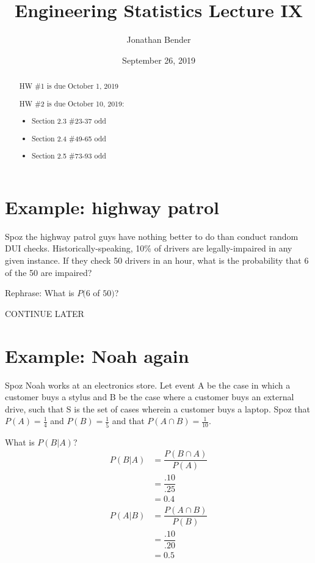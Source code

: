 \documentclass[]{article}
\title{Engineering Statistics Lecture IX}
\author{Jonathan Bender}
\date{September 26, 2019}
\begin{document}
	
	\maketitle
	
	\begin{abstract}
		HW \#1 is due October 1, 2019
		
		HW \#2 is due October 10, 2019:
		\begin{itemize}
			\item Section 2.3 \#23-37 odd
			\item Section 2.4 \#49-65 odd
			\item Section 2.5 \#73-93 odd
		\end{itemize}
	\end{abstract}
	
	\section{Example: highway patrol}
	
	
	Spoz the highway patrol guys have nothing better to do than conduct random DUI checks.
	Historically-speaking, 10\% of drivers are legally-impaired in any given instance.
	If they check 50 drivers in an hour, what is the probability that 6 of the 50 are impaired?
	
	Rephrase: What is $P(6$ of $50)$?
	
	CONTINUE LATER
	
	\section{Example: Noah again}
	
	Spoz Noah works at an electronics store. Let event A be the case in which a customer buys a stylus and B be the case where a customer buys an external drive, such that S is the set of cases wherein a customer buys a laptop.
	Spoz that $P(A) = \frac{1}{4}$ and $P(B) = \frac{1}{5}$ and that $P(A\cap B) = \frac{1}{10}$.
	
	What is $P(B|A)$?
	\begin{align*}
	P(B|A) &= \dfrac{P(B\cap A)}{P(A)}
	     \\&= \dfrac{.10}{.25}
	     \\&= 0.4\\
	P(A|B) &= \dfrac{P(A\cap B)}{P(B)}
	     \\&= \dfrac{.10}{.20}
	     \\&= 0.5
	\end{align*}
	
\end{document}
